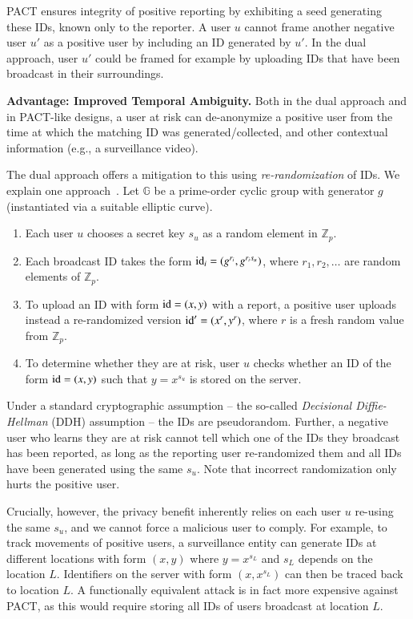 PACT ensures integrity of positive reporting by exhibiting a seed generating these IDs, known only to the reporter. A user $u$ cannot frame another negative user $u'$ as a positive user by including an ID generated by $u'$. In the dual approach, user $u'$ could be framed for example by uploading IDs that have been broadcast in their surroundings.  


{\bf Advantage: Improved Temporal Ambiguity.} Both in the dual approach and in PACT-like designs, a user at risk can de-anonymize a positive user from the time at which the matching ID was generated/collected, and other contextual information (e.g., a surveillance video). 

The dual approach offers a mitigation to this using {\em re-randomization} of IDs. We explain one approach~\cite{yael}. Let $\mathbb{G}$ be a prime-order cyclic group with generator $g$ (instantiated via a suitable elliptic curve). 
\begin{enumerate}
    \item Each user $u$ chooses a secret key $s_u$ as a random element in $\mathbb{Z}_p$.
    \item Each broadcast ID takes the form $\mathrm{id}_i = (g^{r_i}, g^{r_i s_u})$, where $r_1, r_2, \ldots$ are random elements of $\mathbb{Z}_p$.
    \item To upload an ID with form $\mathrm{id} = (x, y)$ with a report, a positive user uploads instead a re-randomized version $\mathrm{id}' = (x^r, y^r)$, where $r$ is a fresh random value from $\mathbb{Z}_p$.
    \item To determine whether they are at risk, user $u$ checks whether an ID of the form $\mathrm{id} = (x,y)$ such that $y = x^{s_u}$ is stored on the server.
\end{enumerate}
Under a standard cryptographic assumption -- the so-called {\em Decisional Diffie-Hellman} (DDH) assumption -- the IDs are pseudorandom. Further, a negative user who learns they are at risk cannot tell which one of the IDs they broadcast has been reported, as long as the reporting user re-randomized them and all IDs have been generated using the same $s_u$. Note that incorrect randomization only hurts the positive user.

Crucially, however, the privacy benefit inherently relies on each user $u$ re-using the same $s_u$, and we cannot force a malicious user to comply. For example, to track movements of positive users, a surveillance entity can generate IDs at different locations with form $(x,y)$ where $y = x^{s_L}$ and $s_L$ depends on the location $L$. Identifiers on the server with form $(x, x^{s_L})$ can then be traced back to location $L$. A functionally equivalent attack is in fact more expensive against PACT, as this would require storing all IDs of users broadcast at location $L$.  


